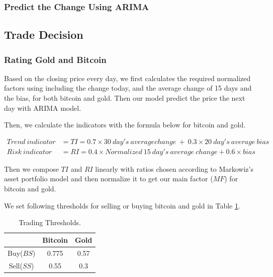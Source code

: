 \documentclass[12pt,a4paper]{article}
\newcommand{\Predictor}{ARIMA }
\begin{document}
\begin{spacing}{1.2}
\subsubsection{Predict the Change Using \Predictor}


\subsection{Trade Decision}

\subsubsection{Rating Gold and Bitcoin}

Based on the closing price every day, we first calculates the required normalized factors using including the change today, and the average change of 15 days and the bias, for both bitcoin and gold. Then our model predict the price the next day with ARIMA model.
	
Then, we calculate the indicators with the formula below for bitcoin and gold. 
	
	
\begin{align*}
Trend \ indicator &= TI = 0.7 \times 30 \ day's \ average change \ + \ 0.3 \times 20 \ day's \ average \ bias \\
Risk \ indicator &= RI = 0.4 \times Normalized \ 15 \ day's \ average \ change + 0.6 \times bias
\end{align*}
	
Then we compose $TI$ and $RI$ linearly with ratios chosen according to Markowiz's asset portfolio model and then normalize it to get our main factor ($MF$) for bitcoin and gold. 
	
We set following thresholds for selling or buying bitcoin and gold in Table \ref{table:threshold}.
	
\begin{table}[H]
		\renewcommand{\arraystretch}{1.5}
		\caption{Trading Thresholds.}
		\label{table:threshold}
		\begin{center}
			{\footnotesize
				\begin{tabular}{c c c}
					\toprule
					{ } & {Bitcoin} & {Gold} \\
					\midrule
					Buy($BS$) & 0.775 & 0.57 \\
					Sell($SS$) & 0.55 & 0.3 \\
					\bottomrule
			\end{tabular}}
		\end{center}	
\end{table}
	

\end{spacing}
\end{document}
